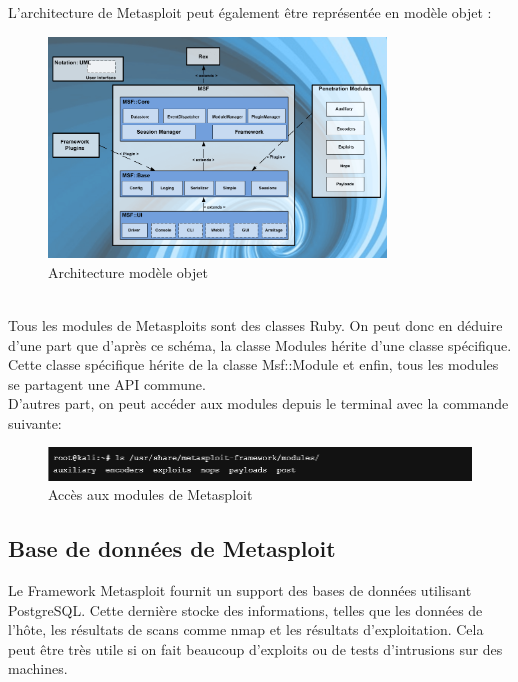  L’architecture de Metasploit peut également être représentée en modèle objet : 
\begin{figure}[htp!]
  \centering
  \setlength\figureheight{7cm}
  \setlength\figurewidth{9cm}
  \includegraphics[width=0.8\textwidth]{oui/Ancien/imangeancien/msfarch2.png}
  \caption{Architecture modèle objet}
  \label{fig:courbe-tikz}
\end{figure}\\
Tous les modules de Metasploits sont des classes Ruby. On peut donc en déduire d'une part que d'après ce schéma, la classe Modules hérite d'une classe spécifique. Cette classe spécifique hérite de la classe Msf::Module et enfin, tous les modules se partagent une API commune.\\

D'autres part, on peut accéder aux modules depuis le terminal avec la commande suivante:
\begin{figure}[htp!]
  \centering
  \setlength\figureheight{7cm}
  \setlength\figurewidth{9cm}
  \includegraphics[width=1\textwidth]{oui/Ancien/imangeancien/modules.PNG}
  \caption{Accès aux modules de Metasploit}
  \label{fig:courbe-tikz}
\end{figure}

\subsection{Base de données de Metasploit}
 Le Framework Metasploit fournit un support des bases de données utilisant  PostgreSQL. Cette dernière stocke des informations, telles que les données de l'hôte, les résultats de scans comme nmap et les résultats d'exploitation. Cela peut être très utile si on fait beaucoup d'exploits ou de tests d'intrusions sur des machines.

